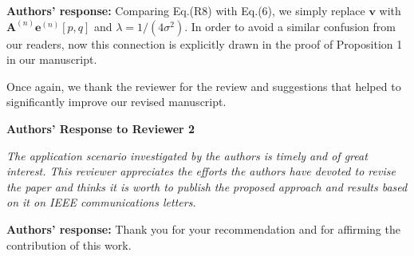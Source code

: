 \documentclass[onecolumn, 11pt, draftclsnofoot]{IEEEtran}
\begin{document}
\noindent \textbf{Authors' response:}
Comparing Eq.(R8) with Eq.(6), we simply replace $\mathbf{v}$ with
$\mathbf{A}^{(n)}\mathbf{e}^{(n)}[p,q]$ and $\lambda = 1/(4\sigma^2)$. In order
to avoid a similar confusion from our readers, now this connection is explicitly
drawn in the proof of Proposition 1 in our manuscript.
 
\vspace{0.5cm}


Once again, we thank the reviewer for the review and suggestions that helped to
significantly improve our revised manuscript. 

\newpage
\begin{center}
{\LARGE \textbf{Authors' Response to Reviewer 2}}
\end{center}

\noindent
\emph{The application scenario investigated by the authors is timely and of
great interest. This reviewer appreciates the efforts the authors have devoted
to revise the paper and thinks it is worth to publish the proposed approach and
results based on it on IEEE communications letters.}

\noindent \textbf{Authors' response:}
Thank you for your recommendation and for affirming the contribution of this work. 

\vspace{0.5cm}



\end{document}
